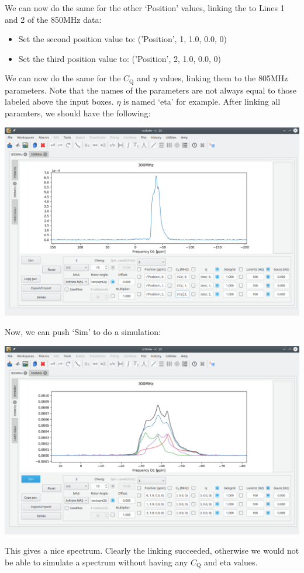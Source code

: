 \documentclass[11pt,a4paper]{article}
\begin{document}
We can now do the same for the other `Position' values, linking the to Lines 1 and 2 of the 850MHz
data:
\begin{itemize}
  \item Set the second position value to: ('Position', 1, 1.0, 0.0, 0)
  \item Set the third position value to: ('Position', 2, 1.0, 0.0, 0)
\end{itemize}

We can now do the same for the $C_\text{Q}$ and $\eta$ values, linking them to the 805MHz
parameters. Note that the names of the parameters are not always equal to those labeled above the
input boxes. $\eta$ is named `eta' for example. After linking all paramters, we should have the
following:
\begin{center}
\includegraphics[width=1.0\linewidth]{Figs/Fig11.png}
\end{center}
Now, we can push `Sim' to do a simulation:
\begin{center}
\includegraphics[width=1.0\linewidth]{Figs/Fig12.png}
\end{center}
This gives a nice spectrum. Clearly the linking succeeded, otherwise we would not be able to simulate
a spectrum without having any $C_\text{Q}$ and eta values.
\end{document}
